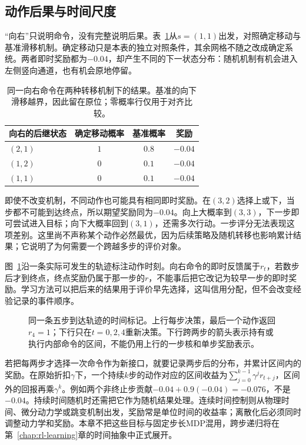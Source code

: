 \subsection{动作后果与时间尺度}
\label{sec:rl-overview-time-scale}

“向右”只说明命令，没有完整说明后果。表~\ref{tab:rl-overview-transition}从$s=(1,1)$出发，对照确定移动与基准滑移机制。确定移动只是本表的独立对照条件，其余网格不随之改成确定系统。两者即时奖励都为$-0.04$，却产生不同的下一状态分布：随机机制有机会进入左侧竖向通道，也有机会原地停留。

\begin{table}[htbp]
  \centering\small
  \begin{tabular}{@{}lccc@{}}
    \toprule
    向右的后继状态 & 确定移动概率 & 基准概率 & 奖励\\
    \midrule
    $(2,1)$ & $1$ & $0.8$ & $-0.04$\\
    $(1,2)$ & $0$ & $0.1$ & $-0.04$\\
    $(1,1)$ & $0$ & $0.1$ & $-0.04$\\
    \bottomrule
  \end{tabular}
  \caption{同一向右命令在两种转移机制下的结果。基准的向下滑移越界，因此留在原位；零概率行仅用于对齐比较。}
  \label{tab:rl-overview-transition}
\end{table}

即使不改变机制，不同动作也可能具有相同即时奖励。在$(3,2)$选择上或下，当步都不可能到达终点，所以期望奖励同为$-0.04$。向上大概率到$(3,3)$，下一步即可尝试进入目标；向下大概率回到$(3,1)$，还需多次行动。一步评分无法表现这项差别。这里尚不声称某个动作必然最优，因为后续策略及随机转移也影响累计结果；它说明了为何需要一个跨越多步的评价对象。

图~\ref{fig:rl-overview-timeline}沿一条实际可发生的轨迹标注动作时刻。向右命令的即时反馈属于$r_t$，若数步后才到终点，终点奖励仍属于那一步的$r$，不能事后把它改记为较早一步的即时奖励。学习方法可以把后来的结果用于评价早先选择，这叫信用分配，但不会改变经验记录的事件顺序。

\begin{figure}[htbp]
  \centering
  
  \caption{同一条五步到达轨迹的时间标记。上行每步决策，最后一个动作返回$r_4=1$；下行只在$t=0,2,4$重新决策。下行跨两步的箭头表示持有或执行内部命令的区间，不能仍用上行的一步核和单步奖励表示。}
  \label{fig:rl-overview-timeline}
\end{figure}

若把每两步才选择一次命令作为新接口，就要记录两步后的分布，并累计区间内的奖励。在原始折扣$\gamma$下，一个持续$k$步的动作对应的区间收益为$\sum_{j=0}^{k-1}\gamma^j r_{t+j}$，区间外的回报再乘$\gamma^k$。例如两个非终止步贡献$-0.04+0.9(-0.04)=-0.076$，不是$-0.04$。持续时间随机时还需把它作为随机结果处理。连续时间控制则从物理时间、微分动力学或跳变机制出发，奖励常是单位时间的收益率；离散化后必须同时调整动力学和奖励。本章不把这些目标与固定步长MDP混用，跨步递归将在第~\ref{chap:rl-learning}章的时间抽象中正式展开。

